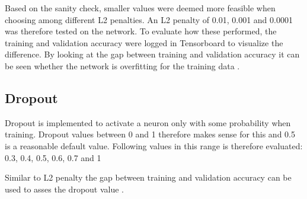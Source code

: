 Based on the sanity check, smaller values were deemed more feasible when choosing among different L2 penalties. An L2 penalty of 0.01, 0.001 and 0.0001 was therefore tested on the network. To evaluate how these performed, the training and validation accuracy were logged in Tensorboard to visualize the difference. By looking at the gap between training and validation accuracy it can be seen whether the network is overfitting for the training data \citep{NN3}.

\subsection{Dropout}
Dropout is implemented to activate a neuron only with some probability when training. Dropout values between 0 and 1 therefore makes sense for this and 0.5 is a reasonable default value\citep{NN3}. Following values in this range is therefore evaluated: 0.3, 0.4, 0.5, 0.6, 0.7 and 1

Similar to L2 penalty the gap between training and validation accuracy can be used to asses the dropout value \citep{NN3}. 





